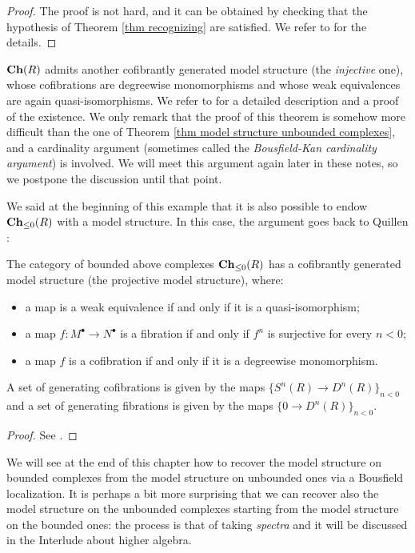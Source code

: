 \begin{refsection}
\begin{proof}
The proof is not hard, and it can be obtained by checking that the hypothesis of Theorem \ref{thm recognizing} are satisfied. We refer to \cite[Theorem 2.3.11]{hovey} for the details.
\end{proof}

\begin{rmk}
$\mathbf{Ch}(R)$ admits another cofibrantly generated model structure (the \emph{injective} one), whose cofibrations are degreewise monomorphisms and whose weak equivalences are again quasi-isomorphisms. We refer to \cite[Theorem 2.3.13]{hovey} for a detailed description and a proof of the existence. We only remark that the proof of this theorem is somehow more difficult than the one of Theorem \ref{thm model structure unbounded complexes}, and a cardinality argument (sometimes called the \emph{Bousfield-Kan cardinality argument}) is involved. We will meet this argument again later in these notes, so we postpone the discussion until that point.
\end{rmk}

We said at the beginning of this example that it is also possible to endow $\mathbf{Ch}_{\le 0}(R)$ with a model structure. In this case, the argument goes back to Quillen \cite{quillen}:

\begin{thm} \label{thm model structure on bounded complexes}
The category of bounded above complexes $\mathbf{Ch}_{\le 0}(R)$ has a cofibrantly generated model structure (the projective model structure), where:
\begin{itemize}
\item a map is a weak equivalence if and only if it is a quasi-isomorphism;
\item a map $f \colon M^\bullet \to N^\bullet$ is a fibration if and only if $f^n$ is surjective for every $n < 0$;
\item a map $f$ is a cofibration if and only if it is a degreewise monomorphism.
\end{itemize}
A set of generating cofibrations is given by the maps $\{S^n(R) \to D^n(R)\}_{n < 0}$ and a set of generating fibrations is given by the maps $\{0 \to D^n(R)\}_{n < 0}$.
\end{thm}

\begin{proof}
See \cite[Theorem 7.2]{dwsp}.
\end{proof}

\begin{rmk}
We will see at the end of this chapter how to recover the model structure on bounded complexes from the model structure on unbounded ones via a Bousfield localization. It is perhaps a bit more surprising that we can recover also the model structure on the unbounded complexes starting from the model structure on the bounded ones: the process is that of taking \emph{spectra} and it will be discussed in the Interlude about higher algebra.
\end{rmk}


\end{refsection}
